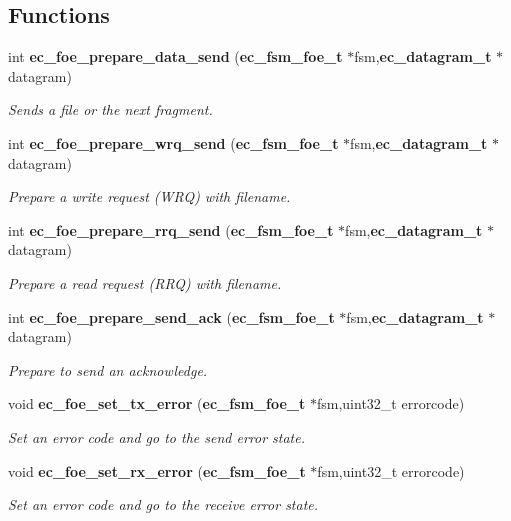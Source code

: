 \subsection*{\-Functions}
\begin{DoxyCompactItemize}
\item 
int {\bf ec\-\_\-foe\-\_\-prepare\-\_\-data\-\_\-send} ({\bf ec\-\_\-fsm\-\_\-foe\-\_\-t} $\ast$fsm,{\bf ec\-\_\-datagram\-\_\-t} $\ast$datagram)
\begin{DoxyCompactList}\small\item\em \-Sends a file or the next fragment. \end{DoxyCompactList}\item 
int {\bf ec\-\_\-foe\-\_\-prepare\-\_\-wrq\-\_\-send} ({\bf ec\-\_\-fsm\-\_\-foe\-\_\-t} $\ast$fsm,{\bf ec\-\_\-datagram\-\_\-t} $\ast$datagram)
\begin{DoxyCompactList}\small\item\em \-Prepare a write request (\-W\-R\-Q) with filename. \end{DoxyCompactList}\item 
int {\bf ec\-\_\-foe\-\_\-prepare\-\_\-rrq\-\_\-send} ({\bf ec\-\_\-fsm\-\_\-foe\-\_\-t} $\ast$fsm,{\bf ec\-\_\-datagram\-\_\-t} $\ast$datagram)
\begin{DoxyCompactList}\small\item\em \-Prepare a read request (\-R\-R\-Q) with filename. \end{DoxyCompactList}\item 
int {\bf ec\-\_\-foe\-\_\-prepare\-\_\-send\-\_\-ack} ({\bf ec\-\_\-fsm\-\_\-foe\-\_\-t} $\ast$fsm,{\bf ec\-\_\-datagram\-\_\-t} $\ast$datagram)
\begin{DoxyCompactList}\small\item\em \-Prepare to send an acknowledge. \end{DoxyCompactList}\item 
void {\bf ec\-\_\-foe\-\_\-set\-\_\-tx\-\_\-error} ({\bf ec\-\_\-fsm\-\_\-foe\-\_\-t} $\ast$fsm,uint32\-\_\-t errorcode)
\begin{DoxyCompactList}\small\item\em \-Set an error code and go to the send error state. \end{DoxyCompactList}\item 
void {\bf ec\-\_\-foe\-\_\-set\-\_\-rx\-\_\-error} ({\bf ec\-\_\-fsm\-\_\-foe\-\_\-t} $\ast$fsm,uint32\-\_\-t errorcode)
\begin{DoxyCompactList}\small\item\em \-Set an error code and go to the receive error state. \end{DoxyCompactList}\item 

\end{DoxyCompactItemize}
